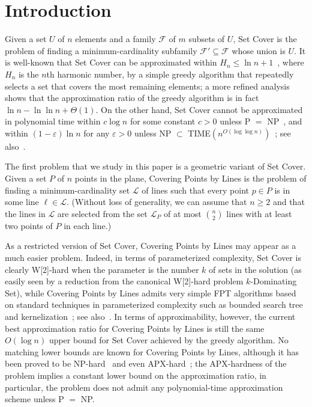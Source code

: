 \documentclass[letterpaper,11pt]{article}
\def\F{{\mathcal F}}
\def\L{{\mathcal L}}
\newcommand{\eps}{\varepsilon}
\begin{document}
\section{Introduction}

Given a set $U$ of $n$ elements and a family $\F$ of $m$ subsets of $U$,
{\sc Set Cover} is the problem of finding a minimum-cardinality subfamily
$\F' \subseteq \F$ whose union is $U$.
It is well-known that
{\sc Set Cover} can be approximated within
$H_n \le \ln n + 1$~\cite{Jo74,Lo75,Ch79},
where $H_n$ is the $n$th harmonic number,
by a simple greedy algorithm that
repeatedly selects a set that covers the most remaining elements;
a more refined analysis~\cite{Sl97} shows that the approximation ratio
of the greedy algorithm is in fact $\ln n - \ln\ln n + \Theta(1)$.
On the other hand, {\sc Set Cover} 
cannot be approximated in polynomial time
within $c \log n$ for some constant $c > 0$
unless P $=$ NP~\cite{RS97},
and
within $(1-\eps)\ln n$
for any $\eps > 0$
unless NP $\subset$ TIME$(n^{O(\log\log n)})$~\cite{Fe98};
see also~\cite{AMS06,LY94}.

The first problem that we study in this paper
is a geometric variant of {\sc Set Cover}.
Given a set $P$ of $n$ points in the plane,
{\sc Covering Points by Lines}
is the problem of finding a minimum-cardinality set $\L$ of lines
such that every point $p \in P$ is in some line $\ell \in \L$.
(Without loss of generality,
we can assume that $n \ge 2$ and that the lines in $\L$ are selected from
the set $\L_P$ of at most $n \choose 2$ lines
with at least two points of $P$ in each line.)

As a restricted version of {\sc Set Cover},
{\sc Covering Points by Lines} may appear as a much easier problem.
Indeed, in terms of parameterized complexity, {\sc Set Cover} is clearly
W[2]-hard when the parameter is the number $k$ of sets in the solution
(as easily seen by a reduction from the canonical W[2]-hard problem
$k$-{\sc Dominating Set}),
while {\sc Covering Points by Lines} 
admits very simple FPT algorithms based on standard
techniques in parameterized complexity such as bounded search tree
and kernelization~\cite{LM05}; see also~\cite{GL06,WLC10}.
In terms of approximability, however,
the current best approximation ratio for {\sc Covering Points by Lines} is still
the same $O(\log n)$ upper bound for {\sc Set Cover}
achieved by the greedy algorithm.
No matching lower bounds are known for {\sc Covering Points by Lines},
although it has been proved to be NP-hard~\cite{MT82}
and even APX-hard~\cite{BHN01,KAR00};
the APX-hardness of the problem implies a constant lower bound
on the approximation ratio, in particular, the problem
does not admit any polynomial-time approximation scheme unless P $=$ NP.
\end{document}
